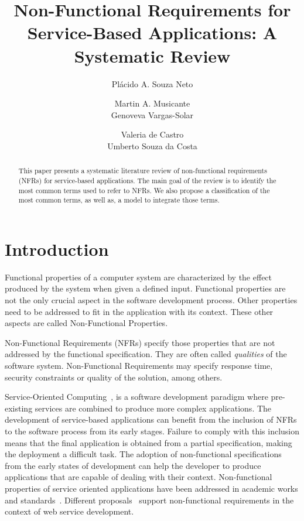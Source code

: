 \documentclass[english,12pt]{article}
\title{Non-Functional Requirements for Service-Based Applications: A Systematic Review}
\author{Pl\'acido A. Souza Neto\inst{1} \and Martin A. Musicante\inst{2}\\ 
Genoveva Vargas-Solar\inst{3} \and Valeria de Castro\inst{4}\\
Umberto Souza da Costa\inst{2} }
\begin{document}
 
 
\maketitle
 
\begin{abstract}
 This paper presents a systematic literature review of non-functional
requirements (NFRs) for service-based applications. 
The main goal of the review is to identify the most common terms used to refer to NFRs.
We also propose a classification of the most common terms, as well as, a model to integrate those terms.
 
\end{abstract}


\section{Introduction}

Functional properties of a computer system are characterized by the effect produced by the system when given a defined input.
Functional properties are not the only crucial aspect in the software development process. 
Other properties need to be addressed to fit in the application with its context.
These other aspects are called Non-Functional Properties.

Non-Functional Requirements (NFRs) specify those properties that are not addressed by the functional  specification.
They are often called \textit{qualities} of the software system.
Non-Functional Requirements may specify response time, security constraints or quality of the solution, among others.




Service-Oriented Computing~\cite{Papazoglou2007}, is a software development paradigm where pre-existing services are combined to produce more complex applications. 
The development of service-based applications can benefit from the inclusion of NFRs to the software process from its early stages.
Failure to comply with this inclusion means that the final application is obtained from a partial specification, making the deployment a difficult task.
The adoption of non-functional specifications from the early states of development
can help the developer to produce applications that are capable of dealing with
their context.
Non-functional properties of service oriented applications have been
addressed in academic works and standards~\cite{ws-co,ws-tra,wsci}.
Different proposals~\cite{Babamir2010,AgarwalLS09,CholletL09,GutierrezRF10,XiaoCZBOLH08,JeongCL09,TsadimasNA12}
support non-functional requirements in the context of web service development. 
\end{document}
